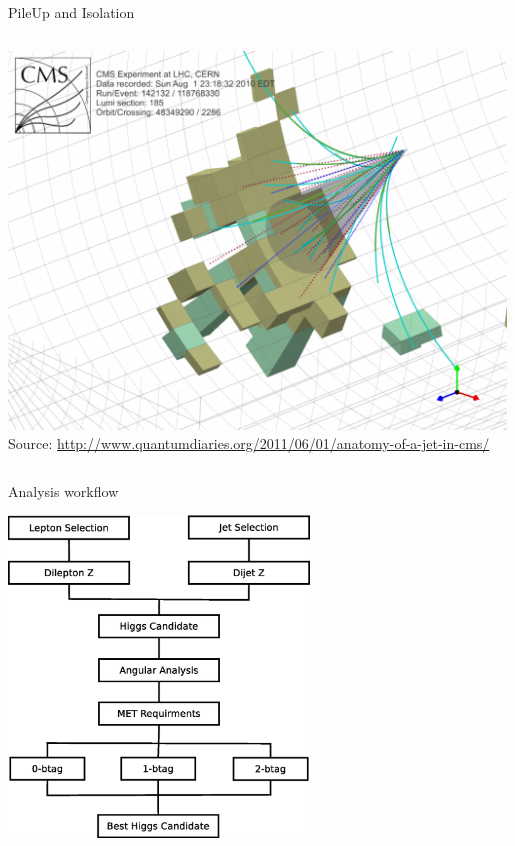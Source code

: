 \begin{frame}{PileUp and Isolation}
\begin{columns}
\begin{column}{0.5\textwidth}
\begin{center}
\includegraphics[width=0.99\textwidth]{images/JetConeAll-1024x778.png}\\
{\fontsize{.1cm}{.001em}\selectfont Source: \url{http://www.quantumdiaries.org/2011/06/01/anatomy-of-a-jet-in-cms/}}
\end{center}
\end{column}
\end{columns}
\end{frame}

\begin{frame}{Analysis workflow}
  \begin{center}
  \includegraphics[width=0.6\textwidth]{images/analysis_strategy.eps}
  \end{center}
\end{frame}

